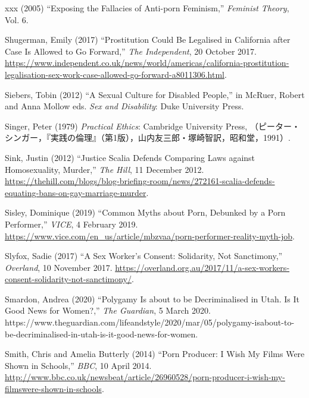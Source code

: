 \documentclass[]{jlreq} \usepackage{mystyle}
\begin{document}
\begin{thebibliography}{xxx}
 \bysame{}  (2005) ``Exposing the Fallacies of Anti-porn Feminism,'' \textit{
  Feminist Theory}, Vol. 6.

Shugerman, Emily (2017) ``Prostitution Could Be Legalised in California after
  Case Is Allowed to Go Forward,'' \emph{The Independent}, 20 October 2017.
  \url{https://www.independent.co.uk/news/world/americas/california-prostitution-legalisation-sex-work-case-allowed-go-forward-a8011306.html}.

Siebers, Tobin (2012) ``A Sexual Culture for Disabled People,'' in McRuer,
  Robert and Anna Mollow eds.   \textit{ Sex and Disability}: Duke University
  Press.

Singer, Peter (1979)  \textit{ Practical Ethics}: Cambridge University Press,
  （ピーター・シンガー，『実践の倫理』（第1版），山内友三郎・塚崎智訳，昭和堂，1991）.

Sink, Justin (2012) ``Justice Scalia Defends Comparing Laws against
  Homosexuality, Murder,'' \emph{The Hill}, 11 December 2012.
  \url{https://thehill.com/blogs/blog-briefing-room/news/272161-scalia-defends-equating-bans-on-gay-marriage-murder}.

Sisley, Dominique (2019) ``Common Myths about Porn, Debunked by a Porn
  Performer,'' \emph{VICE}, 4 February 2019.
  \url{https://www.vice.com/en_us/article/mbzvaa/porn-performer-reality-myth-job}.

Slyfox, Sadie (2017) ``A Sex Worker's Consent: Solidarity, Not Sanctimony,''
  \emph{Overland}, 10 November 2017.
  \url{https://overland.org.au/2017/11/a-sex-workers-consent-solidarity-not-sanctimony/}.

Smardon, Andrea (2020) ``Polygamy Is about to be Decriminalised in Utah. Is It
  Good News for Women?,'' \emph{The Guardian}, 5 March 2020.
  https://www.theguardian.com/lifeandstyle/2020/mar/05/polygamy-isabout-to-be-decriminalised-in-utah-is-it-good-news-for-women.

Smith, Chris and Amelia Butterly (2014) ``Porn Producer: I Wish My Films Were
  Shown in Schools,'' \emph{BBC}, 10 April 2014.
  \url{http://www.bbc.co.uk/newsbeat/article/26960528/porn-producer-i-wish-my-filmswere-shown-in-schools}.


\end{thebibliography}
\end{document}
